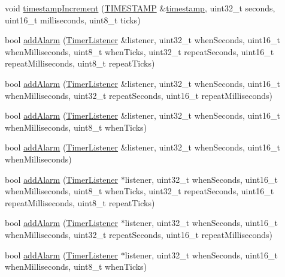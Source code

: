 \begin{DoxyCompactItemize}
\item 
void \hyperlink{classmhvlib_1_1_r_t_c_a2c10e1c3273eea7d58ba76d62f51caef}{timestamp\-Increment} (\hyperlink{namespacemhvlib_ae0658d1591e8aabca3a4b259a0c483cd}{T\-I\-M\-E\-S\-T\-A\-M\-P} \&\hyperlink{structmhvlib_1_1timestamp}{timestamp}, uint32\-\_\-t seconds, uint16\-\_\-t milliseconds, uint8\-\_\-t ticks)
\item 
bool \hyperlink{classmhvlib_1_1_r_t_c_a55f44d8642c5a1c739da2b681bb40849}{add\-Alarm} (\hyperlink{classmhvlib_1_1_timer_listener}{Timer\-Listener} \&listener, uint32\-\_\-t when\-Seconds, uint16\-\_\-t when\-Milliseconds, uint8\-\_\-t when\-Ticks, uint32\-\_\-t repeat\-Seconds, uint16\-\_\-t repeat\-Milliseconds, uint8\-\_\-t repeat\-Ticks)
\item 
bool \hyperlink{classmhvlib_1_1_r_t_c_a78f8590483bb7c288f1a2cce16579339}{add\-Alarm} (\hyperlink{classmhvlib_1_1_timer_listener}{Timer\-Listener} \&listener, uint32\-\_\-t when\-Seconds, uint16\-\_\-t when\-Milliseconds, uint32\-\_\-t repeat\-Seconds, uint16\-\_\-t repeat\-Milliseconds)
\item 
bool \hyperlink{classmhvlib_1_1_r_t_c_afd4e9449abbe7405bdf3ab2a42331e86}{add\-Alarm} (\hyperlink{classmhvlib_1_1_timer_listener}{Timer\-Listener} \&listener, uint32\-\_\-t when\-Seconds, uint16\-\_\-t when\-Milliseconds, uint8\-\_\-t when\-Ticks)
\item 
bool \hyperlink{classmhvlib_1_1_r_t_c_acc895a7eea823477a76728c346828987}{add\-Alarm} (\hyperlink{classmhvlib_1_1_timer_listener}{Timer\-Listener} \&listener, uint32\-\_\-t when\-Seconds, uint16\-\_\-t when\-Milliseconds)
\item 
bool \hyperlink{classmhvlib_1_1_r_t_c_ac55f0cc6d87ad04c0cd2ced86292f780}{add\-Alarm} (\hyperlink{classmhvlib_1_1_timer_listener}{Timer\-Listener} $\ast$listener, uint32\-\_\-t when\-Seconds, uint16\-\_\-t when\-Milliseconds, uint8\-\_\-t when\-Ticks, uint32\-\_\-t repeat\-Seconds, uint16\-\_\-t repeat\-Milliseconds, uint8\-\_\-t repeat\-Ticks)
\item 
bool \hyperlink{classmhvlib_1_1_r_t_c_a231e4481ad234a58dccca904c3fcabd5}{add\-Alarm} (\hyperlink{classmhvlib_1_1_timer_listener}{Timer\-Listener} $\ast$listener, uint32\-\_\-t when\-Seconds, uint16\-\_\-t when\-Milliseconds, uint32\-\_\-t repeat\-Seconds, uint16\-\_\-t repeat\-Milliseconds)
\item 
bool \hyperlink{classmhvlib_1_1_r_t_c_af29ac7903e602ec8d64d299362be778d}{add\-Alarm} (\hyperlink{classmhvlib_1_1_timer_listener}{Timer\-Listener} $\ast$listener, uint32\-\_\-t when\-Seconds, uint16\-\_\-t when\-Milliseconds, uint8\-\_\-t when\-Ticks)

\end{DoxyCompactItemize}

